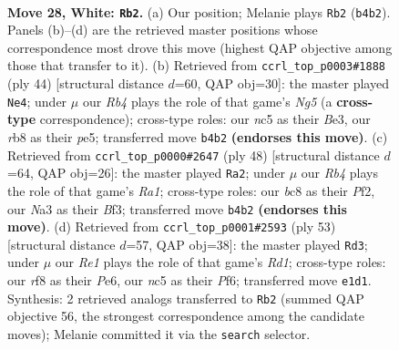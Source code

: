 \documentclass[11pt]{article}
\begin{document}
\clearpage

\begin{figure}[p]\centering
\begin{subfigure}{0.46\textwidth}\centering
\resizebox{\linewidth}{!}{%
\newchessgame
\chessboard[
  setfen={1rb2r2/p4p1k/1pB1p1pp/2n5/1RP5/N1B1P2P/P4PP1/4RK2 w - - 1 28},
  showmover=false,
  pgfstyle=straightmove, color=movearrow, markmove={b4-b2}
]}
\caption{}
\end{subfigure}\hfill
\begin{subfigure}{0.46\textwidth}\centering
\resizebox{\linewidth}{!}{%
\newchessgame
\chessboard[
  setfen={r1b3k1/1p1r2bp/p2p2p1/3Pp1N1/8/1P2B3/1P3PPP/R4RK1 w - - 1 23},
  showmover=false,
  pgfstyle=straightmove, color=movearrow, markmove={g5-e4}
]}
\caption{}
\end{subfigure}
\\[4pt]
\begin{subfigure}{0.46\textwidth}\centering
\resizebox{\linewidth}{!}{%
\newchessgame
\chessboard[
  setfen={r1r3k1/p4p1p/2p3p1/1b6/2nBP3/2P2BP1/5P1P/RR4K1 w - - 9 25},
  showmover=false,
  pgfstyle=straightmove, color=movearrow, markmove={a1-a2}
]}
\caption{}
\end{subfigure}\hfill
\begin{subfigure}{0.46\textwidth}\centering
\resizebox{\linewidth}{!}{%
\newchessgame
\chessboard[
  setfen={1r1r2k1/p3b1pp/4pp2/2p5/n7/P3PN2/1PR2PPP/1R2B1K1 b - - 2 27},
  showmover=false,
  pgfstyle=straightmove, color=movearrow, markmove={d8-d3}
]}
\caption{}
\end{subfigure}
\caption{\textbf{Move 28, White: \texttt{Rb2}.} (a) Our position; Melanie plays \texttt{Rb2} (\texttt{b4b2}). Panels (b)--(d) are the retrieved master positions whose correspondence most drove this move (highest QAP objective among those that transfer to it). (b) Retrieved from \texttt{ccrl\_top\_p0003\#1888} (ply 44) [structural distance $d$=60, QAP obj=30]: the master played \texttt{Ne4}; under $\mu$ our \emph{Rb4} plays the role of that game's \emph{Ng5} (a \textbf{cross-type} correspondence); cross-type roles: our \emph{n}c5 as their \emph{B}e3, our \emph{r}b8 as their \emph{p}e5; transferred move \texttt{b4b2} \textbf{(endorses this move)}. (c) Retrieved from \texttt{ccrl\_top\_p0000\#2647} (ply 48) [structural distance $d$=64, QAP obj=26]: the master played \texttt{Ra2}; under $\mu$ our \emph{Rb4} plays the role of that game's \emph{Ra1}; cross-type roles: our \emph{b}c8 as their \emph{P}f2, our \emph{N}a3 as their \emph{B}f3; transferred move \texttt{b4b2} \textbf{(endorses this move)}. (d) Retrieved from \texttt{ccrl\_top\_p0001\#2593} (ply 53) [structural distance $d$=57, QAP obj=38]: the master played \texttt{Rd3}; under $\mu$ our \emph{Re1} plays the role of that game's \emph{Rd1}; cross-type roles: our \emph{r}f8 as their \emph{P}e6, our \emph{n}c5 as their \emph{P}f6; transferred move \texttt{e1d1}. Synthesis: 2 retrieved analogs transferred to \texttt{Rb2} (summed QAP objective 56, the strongest correspondence among the candidate moves); Melanie committed it via the \texttt{search} selector.}
\label{fig:thought-m54}
\end{figure}
\end{document}
